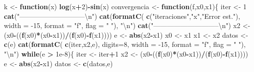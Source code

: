 \documentclass[]{article}
\newenvironment{Shaded}{\begin{snugshade}}{\end{snugshade}}
\newcommand{\CharTok}[1]{\textcolor[rgb]{0.31,0.60,0.02}{#1}}
\newcommand{\ControlFlowTok}[1]{\textcolor[rgb]{0.13,0.29,0.53}{\textbf{#1}}}
\newcommand{\DataTypeTok}[1]{\textcolor[rgb]{0.13,0.29,0.53}{#1}}
\newcommand{\DecValTok}[1]{\textcolor[rgb]{0.00,0.00,0.81}{#1}}
\newcommand{\FloatTok}[1]{\textcolor[rgb]{0.00,0.00,0.81}{#1}}
\newcommand{\KeywordTok}[1]{\textcolor[rgb]{0.13,0.29,0.53}{\textbf{#1}}}
\newcommand{\NormalTok}[1]{#1}
\newcommand{\OperatorTok}[1]{\textcolor[rgb]{0.81,0.36,0.00}{\textbf{#1}}}
\newcommand{\StringTok}[1]{\textcolor[rgb]{0.31,0.60,0.02}{#1}}
\begin{document}
\begin{Shaded}
\begin{Highlighting}[]
\NormalTok{k <-}\StringTok{ }\ControlFlowTok{function}\NormalTok{(x) }\KeywordTok{log}\NormalTok{(x}\OperatorTok{+}\DecValTok{2}\NormalTok{)}\OperatorTok{-}\KeywordTok{sin}\NormalTok{(x)}
\NormalTok{convergencia <-}\StringTok{ }\ControlFlowTok{function}\NormalTok{(f,x0,x1)\{}
\NormalTok{  iter <-}\StringTok{ }\DecValTok{1}
  \KeywordTok{cat}\NormalTok{(}\StringTok{"-----------------------------}\CharTok{\textbackslash{}n}\StringTok{"}\NormalTok{)}
  \KeywordTok{cat}\NormalTok{(}\KeywordTok{formatC}\NormalTok{( }\KeywordTok{c}\NormalTok{(}\StringTok{"iteraciones"}\NormalTok{,}\StringTok{"x"}\NormalTok{,}\StringTok{"Error est."}\NormalTok{), }\DataTypeTok{width =} \DecValTok{-15}\NormalTok{, }\DataTypeTok{format =} \StringTok{"f"}\NormalTok{, }\DataTypeTok{flag =} \StringTok{" "}\NormalTok{), }\StringTok{"}\CharTok{\textbackslash{}n}\StringTok{"}\NormalTok{) }
  \KeywordTok{cat}\NormalTok{(}\StringTok{"-----------------------------}\CharTok{\textbackslash{}n}\StringTok{"}\NormalTok{)}
\NormalTok{  x2 <-}\StringTok{ }\NormalTok{(x0}\OperatorTok{-}\NormalTok{((}\KeywordTok{f}\NormalTok{(x0)}\OperatorTok{*}\NormalTok{(x0}\OperatorTok{-}\NormalTok{x1))}\OperatorTok{/}\NormalTok{(}\KeywordTok{f}\NormalTok{(x0)}\OperatorTok{-}\KeywordTok{f}\NormalTok{(x1))))}
\NormalTok{  e <-}\StringTok{ }\KeywordTok{abs}\NormalTok{(x2}\OperatorTok{-}\NormalTok{x1)}
\NormalTok{  x0 <-}\StringTok{ }\NormalTok{x1}
\NormalTok{  x1 <-}\StringTok{ }\NormalTok{x2}
\NormalTok{  datos <-}\StringTok{ }\KeywordTok{c}\NormalTok{(e)}
  \KeywordTok{cat}\NormalTok{(}\KeywordTok{formatC}\NormalTok{( }\KeywordTok{c}\NormalTok{(iter,x2,e), }\DataTypeTok{digits=}\DecValTok{8}\NormalTok{, }\DataTypeTok{width =} \DecValTok{-15}\NormalTok{, }\DataTypeTok{format =} \StringTok{"f"}\NormalTok{, }\DataTypeTok{flag =} \StringTok{" "}\NormalTok{), }\StringTok{"}\CharTok{\textbackslash{}n}\StringTok{"}\NormalTok{) }
  \ControlFlowTok{while}\NormalTok{(e }\OperatorTok{>}\StringTok{ }\FloatTok{1e-8}\NormalTok{)\{}
\NormalTok{    iter <-}\StringTok{ }\NormalTok{iter}\OperatorTok{+}\DecValTok{1}
\NormalTok{    x2 <-}\StringTok{ }\NormalTok{(x0}\OperatorTok{-}\NormalTok{((}\KeywordTok{f}\NormalTok{(x0)}\OperatorTok{*}\NormalTok{(x0}\OperatorTok{-}\NormalTok{x1))}\OperatorTok{/}\NormalTok{(}\KeywordTok{f}\NormalTok{(x0)}\OperatorTok{-}\KeywordTok{f}\NormalTok{(x1))))}
\NormalTok{    e <-}\StringTok{ }\KeywordTok{abs}\NormalTok{(x2}\OperatorTok{-}\NormalTok{x1)}
\NormalTok{    datos <-}\StringTok{ }\KeywordTok{c}\NormalTok{(datos,e)}

\end{Highlighting}
\end{Shaded}
\end{document}

